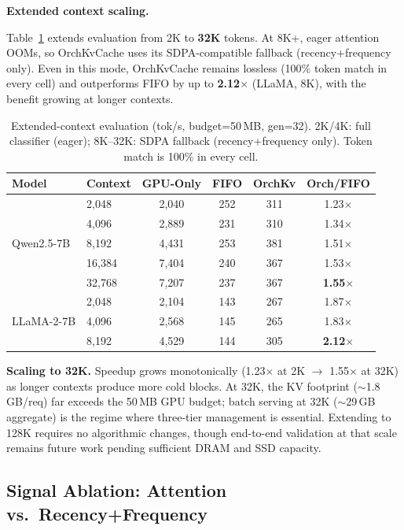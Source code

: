 \documentclass[conference]{IEEEtran}
\begin{document}
\textbf{Extended context scaling.}
\label{sec:scale}

Table~\ref{tab:scale} extends evaluation from 2K to \textbf{32K} tokens. At 8K+, eager attention OOMs, so OrchKvCache uses its SDPA-compatible fallback (recency+frequency only). Even in this mode, OrchKvCache remains lossless (100\% token match in every cell) and outperforms FIFO by up to \textbf{2.12$\times$} (LLaMA, 8K), with the benefit growing at longer contexts.

\begin{table}[t]
\centering
\caption{Extended-context evaluation (tok/s, budget=50\,MB, gen=32). 2K/4K: full classifier (eager); 8K--32K: SDPA fallback (recency+frequency only). Token match is 100\% in every cell.}
\label{tab:scale}
\footnotesize
\setlength{\tabcolsep}{4pt}
\begin{tabular}{@{}llcccc@{}}
\toprule
Model & Context & GPU-Only & FIFO & OrchKv & Orch/FIFO \\
\midrule
\multirow{5}{*}{Qwen2.5-7B}
& 2{,}048  & 2{,}040 & 252  & 311  & 1.23$\times$ \\
& 4{,}096  & 2{,}889 & 231  & 310  & 1.34$\times$ \\
& 8{,}192  & 4{,}431 & 253  & 381  & 1.51$\times$ \\
& 16{,}384 & 7{,}404 & 240  & 367  & 1.53$\times$ \\
& 32{,}768 & 7{,}207 & 237  & 367  & \textbf{1.55$\times$} \\
\midrule
\multirow{3}{*}{LLaMA-2-7B}
& 2{,}048  & 2{,}104 & 143  & 267  & 1.87$\times$ \\
& 4{,}096  & 2{,}568 & 145  & 265  & 1.83$\times$ \\
& 8{,}192  & 4{,}529 & 144  & 305  & \textbf{2.12$\times$} \\
\bottomrule
\end{tabular}
\end{table}

\textbf{Scaling to 32K.} Speedup grows monotonically (1.23$\times$ at 2K $\to$ 1.55$\times$ at 32K) as longer contexts produce more cold blocks. At 32K, the KV footprint (${\sim}$1.8\,GB/req) far exceeds the 50\,MB GPU budget; batch serving at 32K (${\sim}$29\,GB aggregate) is the regime where three-tier management is essential. Extending to 128K requires no algorithmic changes, though end-to-end validation at that scale remains future work pending sufficient DRAM and SSD capacity.

\subsection{Signal Ablation: Attention vs.\ Recency+Frequency}
\label{sec:signal-ablation}
\end{document}
